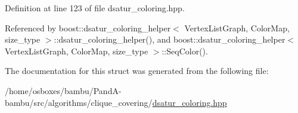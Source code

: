 Definition at line 123 of file dsatur\+\_\+coloring.\+hpp.



Referenced by boost\+::dsatur\+\_\+coloring\+\_\+helper$<$ Vertex\+List\+Graph, Color\+Map, size\+\_\+type $>$\+::dsatur\+\_\+coloring\+\_\+helper(), and boost\+::dsatur\+\_\+coloring\+\_\+helper$<$ Vertex\+List\+Graph, Color\+Map, size\+\_\+type $>$\+::\+Seq\+Color().



The documentation for this struct was generated from the following file\+:\begin{DoxyCompactItemize}
\item 
/home/osboxes/bambu/\+Pand\+A-\/bambu/src/algorithms/clique\+\_\+covering/\hyperlink{dsatur__coloring_8hpp}{dsatur\+\_\+coloring.\+hpp}\end{DoxyCompactItemize}
